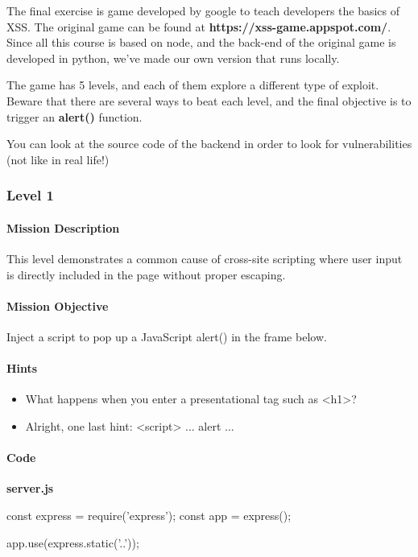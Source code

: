 
\begin{Exercise}[label={websec-xss-game}]
	The final exercise is game developed by google to teach developers the basics of XSS. The original game can be found at \textbf{https://xss-game.appspot.com/}. Since all this course is based on node, and the back-end of the original game is developed in python, we've made our own version that runs locally. 
	
	The game has 5 levels, and each of them explore a different type of exploit. Beware that there are several ways to beat each level, and the final objective is to trigger an \textbf{alert()} function.
	
	You can look at the source code of the backend in order to look for vulnerabilities (not like in real life!)
	
	\subsubsection{Level 1}
\paragraph{Mission Description}
This level demonstrates a common cause of cross-site scripting where user input is directly included in the page without proper escaping. 

\paragraph{Mission Objective}
Inject a script to pop up a JavaScript alert() in the frame below.

\paragraph{Hints}
\begin{itemize}
\item What happens when you enter a presentational tag such as <h1>?
\item Alright, one last hint: <script> ... alert ... 
\end{itemize}

\paragraph{Code}
\textbf{server.js}
\begin{js}
const express = require('express');
const app = express();

app.use(express.static('..'));


\end{js}
\end{Exercise}
